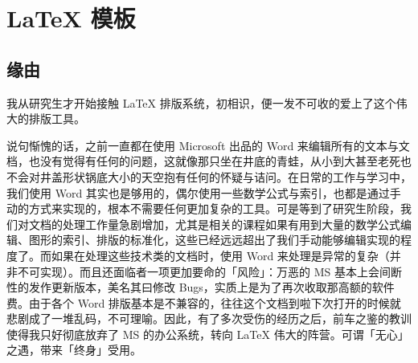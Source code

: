 \documentclass[color=green,mathpazo,titlestyle=hang]{elegantbook}\usepackage[]{graphicx}\usepackage[]{color}
\author{方 莲}
\begin{document}






\maketitle
\tableofcontents
\mainmatter


\chapter{\LaTeX{} 模板}
\section{缘由}
我从研究生才开始接触 \LaTeX{} 排版系统，初相识，便一发不可收的爱上了这个伟大的排版工具。

说句惭愧的话，之前一直都在使用 Microsoft 出品的 Word 来编辑所有的文本与文档，也没有觉得有任何的问题，这就像那只坐在井底的青蛙，从小到大甚至老死也不会对井盖形状锅底大小的天空抱有任何的怀疑与诘问。在日常的工作与学习中，我们使用 Word 其实也是够用的，偶尔使用一些数学公式与索引，也都是通过手动的方式来实现的，根本不需要任何更加复杂的工具。可是等到了研究生阶段，我们对文档的处理工作量急剧增加，尤其是相关的课程如果有用到大量的数学公式编辑、图形的索引、排版的标准化，这些已经远远超出了我们手动能够编辑实现的程度了。而如果在处理这些技术类的文档时，使用 Word 来处理是异常的复杂（并非不可实现）。而且还面临者一项更加要命的「风险」：万恶的 MS 基本上会间断性的发作更新版本，美名其曰修改 Bugs，实质上是为了再次收取那高额的软件费。由于各个 Word 排版基本是不兼容的，往往这个文档到啦下次打开的时候就悲剧成了一堆乱码，不可理喻。因此，有了多次受伤的经历之后，前车之鉴的教训使得我只好彻底放弃了 MS 的办公系统，转向 \LaTeX{} 伟大的阵营。可谓「无心」之遇，带来「终身」受用。
\end{document}
